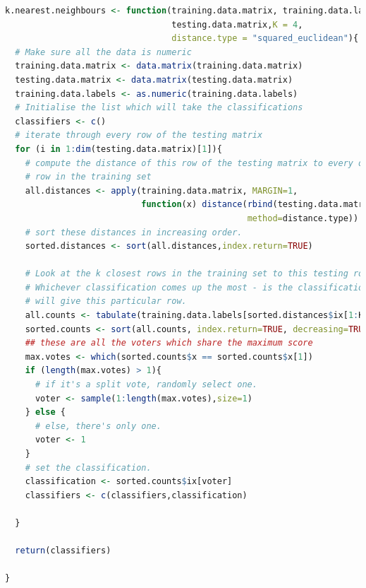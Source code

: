 \documentclass[11pt]{article}
\begin{document}
\begin{lstlisting}[linewidth=18.4cm,language=R]
k.nearest.neighbours <- function(training.data.matrix, training.data.labels, 
                                 testing.data.matrix,K = 4, 
                                 distance.type = "squared_euclidean"){
  # Make sure all the data is numeric
  training.data.matrix <- data.matrix(training.data.matrix)
  testing.data.matrix <- data.matrix(testing.data.matrix)
  training.data.labels <- as.numeric(training.data.labels)
  # Initialise the list which will take the classifications
  classifiers <- c()
  # iterate through every row of the testing matrix
  for (i in 1:dim(testing.data.matrix)[1]){
    # compute the distance of this row of the testing matrix to every other 
    # row in the training set
    all.distances <- apply(training.data.matrix, MARGIN=1, 
                           function(x) distance(rbind(testing.data.matrix[i,],x), 
                                                method=distance.type))
    # sort these distances in increasing order.
    sorted.distances <- sort(all.distances,index.return=TRUE)
    
    # Look at the k closest rows in the training set to this testing row. 
    # Whichever classification comes up the most - is the classification we 
    # will give this particular row.
    all.counts <- tabulate(training.data.labels[sorted.distances$ix[1:K]])
    sorted.counts <- sort(all.counts, index.return=TRUE, decreasing=TRUE)
    ## these are all the voters which share the maximum score
    max.votes <- which(sorted.counts$x == sorted.counts$x[1])
    if (length(max.votes) > 1){
      # if it's a split vote, randomly select one.
      voter <- sample(1:length(max.votes),size=1)
    } else {
      # else, there's only one.
      voter <- 1
    }
    # set the classification.
    classification <- sorted.counts$ix[voter]
    classifiers <- c(classifiers,classification)

  }
  
  return(classifiers)
  
}
\end{lstlisting}
\end{document}
